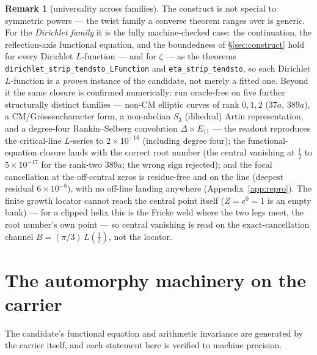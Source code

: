 \documentclass[11pt]{article}
\theoremstyle{definition}
\newtheorem{remark}[theorem]{Remark}
\begin{document}
\begin{remark}[universality across families]
The construct is not special to symmetric powers --- the twist family a converse theorem ranges over
is generic. For the \emph{Dirichlet family} it is the fully machine-checked case: the continuation, the
reflection-axis functional equation, and the boundedness of \S\ref{sec:construct} hold for every
Dirichlet $L$-function --- and for $\zeta$ --- as the theorems
\texttt{dirichlet\_strip\_tendsto\_LFunction} and \texttt{eta\_strip\_tendsto}, so each Dirichlet
$L$-function is a \emph{proven} instance of the candidate, not merely a fitted one. Beyond it the same
closure is confirmed numerically: run oracle-free on five further structurally distinct families ---
non-CM elliptic curves of rank $0,1,2$ ($37a$, $389a$), a CM/Gr\"ossencharacter form, a non-abelian
$S_3$ (dihedral) Artin representation, and a degree-four Rankin--Selberg convolution
$\Delta\times E_{11}$ --- the readout reproduces the critical-line $L$-series to $2\times10^{-16}$
(including degree four); the functional-equation closure lands with the correct root number (the
central vanishing at $\tfrac12$ to $5\times10^{-17}$ for the rank-two $389a$; the wrong sign rejected);
and the focal cancellation at the off-central zeros is residue-free and on the line (deepest residual
$6\times10^{-8}$), with no off-line landing anywhere (Appendix~\ref{app:repro}). The finite growth
locator cannot reach the central point itself ($Z=e^{0}=1$ is an empty bank) --- for a clipped helix
this is the Fricke weld where the two legs meet, the root number's own point --- so central vanishing
is read on the exact-cancellation channel $B=(\pi/3)\,L(\tfrac12)$, not the locator.
\end{remark}

\section{The automorphy machinery on the carrier}\label{sec:machinery}

The candidate's functional equation and arithmetic invariance are generated by the carrier itself, and
each statement here is verified to machine precision.
\end{document}
